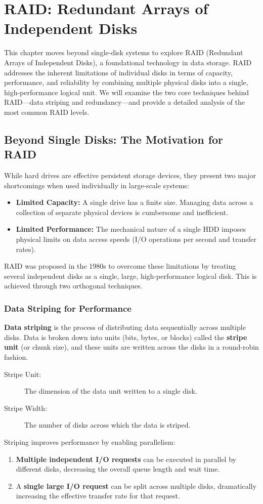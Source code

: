 \chapter{RAID: Redundant Arrays of Independent Disks}

This chapter moves beyond single-disk systems to explore RAID (Redundant Arrays of Independent Disks), a foundational technology in data storage. RAID addresses the inherent limitations of individual disks in terms of capacity, performance, and reliability by combining multiple physical disks into a single, high-performance logical unit. We will examine the two core techniques behind RAID—data striping and redundancy—and provide a detailed analysis of the most common RAID levels.

\section{Beyond Single Disks: The Motivation for RAID}
While hard drives are effective persistent storage devices, they present two major shortcomings when used individually in large-scale systems:
\begin{itemize}
    \item \textbf{Limited Capacity:} A single drive has a finite size. Managing data across a collection of separate physical devices is cumbersome and inefficient.
    \item \textbf{Limited Performance:} The mechanical nature of a single HDD imposes physical limits on data access speeds (I/O operations per second and transfer rates).
\end{itemize}
RAID was proposed in the 1980s to overcome these limitations by treating several independent disks as a single, large, high-performance logical disk. This is achieved through two orthogonal techniques.

\subsection{Data Striping for Performance}
\textbf{Data striping} is the process of distributing data sequentially across multiple disks. Data is broken down into units (bits, bytes, or blocks) called the \textbf{stripe unit} (or chunk size), and these units are written across the disks in a round-robin fashion.
\begin{description}
    \item[Stripe Unit:] The dimension of the data unit written to a single disk.
    \item[Stripe Width:] The number of disks across which the data is striped.
\end{description}
Striping improves performance by enabling parallelism:
\begin{enumerate}
    \item \textbf{Multiple independent I/O requests} can be executed in parallel by different disks, decreasing the overall queue length and wait time.
    \item A \textbf{single large I/O request} can be split across multiple disks, dramatically increasing the effective transfer rate for that request.
\end{enumerate}

